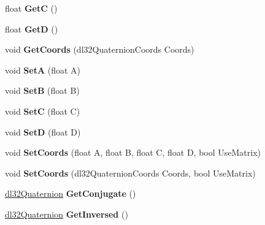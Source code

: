 \begin{DoxyCompactItemize}
\item 
\hypertarget{classdl32_quaternion_a9c42890b840fff17d7f632fe34baf258}{float {\bfseries Get\-C} ()}\label{classdl32_quaternion_a9c42890b840fff17d7f632fe34baf258}

\item 
\hypertarget{classdl32_quaternion_ae9a2ebdccdda9ecc4ff56daaedf5dd20}{float {\bfseries Get\-D} ()}\label{classdl32_quaternion_ae9a2ebdccdda9ecc4ff56daaedf5dd20}

\item 
\hypertarget{classdl32_quaternion_a19ed8e873e5d53e79d74b6cf7193b132}{void {\bfseries Get\-Coords} (dl32\-Quaternion\-Coords Coords)}\label{classdl32_quaternion_a19ed8e873e5d53e79d74b6cf7193b132}

\item 
\hypertarget{classdl32_quaternion_a11fb9fe27749749f8fc2d1f86aea21f6}{void {\bfseries Set\-A} (float A)}\label{classdl32_quaternion_a11fb9fe27749749f8fc2d1f86aea21f6}

\item 
\hypertarget{classdl32_quaternion_a49652ae87c49890eed33c7d91a6ae89b}{void {\bfseries Set\-B} (float B)}\label{classdl32_quaternion_a49652ae87c49890eed33c7d91a6ae89b}

\item 
\hypertarget{classdl32_quaternion_a7b9bdabc67cba30a3891d44e9d6a7afa}{void {\bfseries Set\-C} (float C)}\label{classdl32_quaternion_a7b9bdabc67cba30a3891d44e9d6a7afa}

\item 
\hypertarget{classdl32_quaternion_a04d5a805dbc4c0d604579673f527403c}{void {\bfseries Set\-D} (float D)}\label{classdl32_quaternion_a04d5a805dbc4c0d604579673f527403c}

\item 
\hypertarget{classdl32_quaternion_aa6cf9a4bb9725da44f4716681010721f}{void {\bfseries Set\-Coords} (float A, float B, float C, float D, bool Use\-Matrix)}\label{classdl32_quaternion_aa6cf9a4bb9725da44f4716681010721f}

\item 
\hypertarget{classdl32_quaternion_a9b5a8f1c745c768c4f06d0849be46426}{void {\bfseries Set\-Coords} (dl32\-Quaternion\-Coords Coords, bool Use\-Matrix)}\label{classdl32_quaternion_a9b5a8f1c745c768c4f06d0849be46426}

\item 
\hypertarget{classdl32_quaternion_a3a95cae1b920270386f286977a82106b}{\hyperlink{classdl32_quaternion}{dl32\-Quaternion} {\bfseries Get\-Conjugate} ()}\label{classdl32_quaternion_a3a95cae1b920270386f286977a82106b}

\item 
\hypertarget{classdl32_quaternion_abf0edc70d09e266325cdf8ac420e7986}{\hyperlink{classdl32_quaternion}{dl32\-Quaternion} {\bfseries Get\-Inversed} ()}\label{classdl32_quaternion_abf0edc70d09e266325cdf8ac420e7986}

\end{DoxyCompactItemize}
